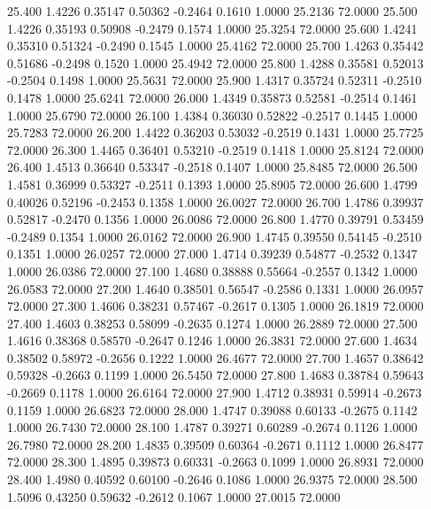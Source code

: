   25.400   1.4226   0.35147   0.50362  -0.2464   0.1610   1.0000  25.2136  72.0000
  25.500   1.4226   0.35193   0.50908  -0.2479   0.1574   1.0000  25.3254  72.0000
  25.600   1.4241   0.35310   0.51324  -0.2490   0.1545   1.0000  25.4162  72.0000
  25.700   1.4263   0.35442   0.51686  -0.2498   0.1520   1.0000  25.4942  72.0000
  25.800   1.4288   0.35581   0.52013  -0.2504   0.1498   1.0000  25.5631  72.0000
  25.900   1.4317   0.35724   0.52311  -0.2510   0.1478   1.0000  25.6241  72.0000
  26.000   1.4349   0.35873   0.52581  -0.2514   0.1461   1.0000  25.6790  72.0000
  26.100   1.4384   0.36030   0.52822  -0.2517   0.1445   1.0000  25.7283  72.0000
  26.200   1.4422   0.36203   0.53032  -0.2519   0.1431   1.0000  25.7725  72.0000
  26.300   1.4465   0.36401   0.53210  -0.2519   0.1418   1.0000  25.8124  72.0000
  26.400   1.4513   0.36640   0.53347  -0.2518   0.1407   1.0000  25.8485  72.0000
  26.500   1.4581   0.36999   0.53327  -0.2511   0.1393   1.0000  25.8905  72.0000
  26.600   1.4799   0.40026   0.52196  -0.2453   0.1358   1.0000  26.0027  72.0000
  26.700   1.4786   0.39937   0.52817  -0.2470   0.1356   1.0000  26.0086  72.0000
  26.800   1.4770   0.39791   0.53459  -0.2489   0.1354   1.0000  26.0162  72.0000
  26.900   1.4745   0.39550   0.54145  -0.2510   0.1351   1.0000  26.0257  72.0000
  27.000   1.4714   0.39239   0.54877  -0.2532   0.1347   1.0000  26.0386  72.0000
  27.100   1.4680   0.38888   0.55664  -0.2557   0.1342   1.0000  26.0583  72.0000
  27.200   1.4640   0.38501   0.56547  -0.2586   0.1331   1.0000  26.0957  72.0000
  27.300   1.4606   0.38231   0.57467  -0.2617   0.1305   1.0000  26.1819  72.0000
  27.400   1.4603   0.38253   0.58099  -0.2635   0.1274   1.0000  26.2889  72.0000
  27.500   1.4616   0.38368   0.58570  -0.2647   0.1246   1.0000  26.3831  72.0000
  27.600   1.4634   0.38502   0.58972  -0.2656   0.1222   1.0000  26.4677  72.0000
  27.700   1.4657   0.38642   0.59328  -0.2663   0.1199   1.0000  26.5450  72.0000
  27.800   1.4683   0.38784   0.59643  -0.2669   0.1178   1.0000  26.6164  72.0000
  27.900   1.4712   0.38931   0.59914  -0.2673   0.1159   1.0000  26.6823  72.0000
  28.000   1.4747   0.39088   0.60133  -0.2675   0.1142   1.0000  26.7430  72.0000
  28.100   1.4787   0.39271   0.60289  -0.2674   0.1126   1.0000  26.7980  72.0000
  28.200   1.4835   0.39509   0.60364  -0.2671   0.1112   1.0000  26.8477  72.0000
  28.300   1.4895   0.39873   0.60331  -0.2663   0.1099   1.0000  26.8931  72.0000
  28.400   1.4980   0.40592   0.60100  -0.2646   0.1086   1.0000  26.9375  72.0000
  28.500   1.5096   0.43250   0.59632  -0.2612   0.1067   1.0000  27.0015  72.0000
